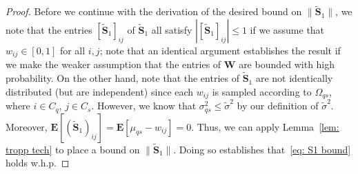 \documentclass[twoside,11pt]{article}
\renewcommand{\S}{\mathbf{S}}
\newcommand{\E}{\mathbf{E}}
\newcommand{\St}{\bs{\tilde S}}
\newcommand{\bs}{\boldsymbol}
\newcommand{\W}{\bs {W}}
\newcommand{\0}{\bs{0}}
\newcommand{\sbra}[1] {\ensuremath{ \left[ #1\right]}} %
\newcommand{\bra}[1]{\ensuremath{\left\{ #1 \right\}}} %
\begin{document}
{\begin{proof}
Before we continue with the derivation of the desired bound on \(\|\St_1\|\), we note that
the entries $[\St_1]_{ij}$ of $\St_1$ all satisfy $|[\St_1]_{ij}| \leq 1$ if we assume that \(w_{ij} \in [0,1]\)
for all \(i,j\); note that an identical argument establishes the result if we make the weaker assumption that
the entries of \(\W\) are bounded with high probability.
On the other hand, note that the
entries of $\St_1$ are not identically distributed (but are independent) since each $w_{ij}$ is sampled according to $\Omega_{qs}$, where $i \in C_q$, $j\in C_s$. However, we know that $\sigma^2_{qs} \le \tilde\sigma^2$ by our definition of $\tilde\sigma^2$. Moreover, $\E[{(\St_1)}_{ij}] = \E[\mu_{qs} - w_{ij}] = 0$.
Thus, we can apply Lemma~\ref{lem: tropp tech} to place a bound on $\|\St_1\|$.
Doing so establishes that~\eqref{eq: S1 bound} holds w.h.p.
%

\end{proof}}
\end{document}
